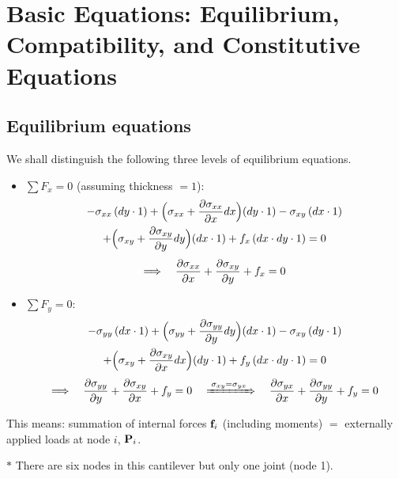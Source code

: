 \chapter[Basic Equations]{Basic Equations: Equilibrium, Compatibility, and Constitutive Equations}

\section{Equilibrium equations}
We shall distinguish the following three levels of equilibrium equations.

\begin{fig}
  
\end{fig}
\begin{itemize}
  \item $\sum F_x = 0$ (assuming thickness $=1$):
  \begin{multline*}
    -\sigma_{xx}\,(dy\cdot 1) + \Bigl(\sigma_{xx}+\frac{\partial \sigma_{xx}}{\partial x}dx\Bigr)(dy\cdot 1)
    - \sigma_{xy}\,(dx\cdot 1) \\
    + \Bigl(\sigma_{xy}+\frac{\partial \sigma_{xy}}{\partial y}dy\Bigr)(dx\cdot 1) + f_x\,(dx\cdot dy\cdot 1) = 0
  \end{multline*}
  \begin{equation}
    \Longrightarrow\quad \frac{\partial \sigma_{xx}}{\partial x}+\frac{\partial \sigma_{xy}}{\partial y}+f_x = 0
  \end{equation}
  \item $\sum F_y = 0$:
  \begin{multline*}
    -\sigma_{yy}\,(dx\cdot 1) + \Bigl(\sigma_{yy}+\frac{\partial \sigma_{yy}}{\partial y}dy\Bigr)(dx\cdot 1)
    - \sigma_{xy}\,(dy\cdot 1) \\
    + \Bigl(\sigma_{xy}+\frac{\partial \sigma_{xy}}{\partial x}dx\Bigr)(dy\cdot 1) + f_y\,(dx\cdot dy\cdot 1) = 0
  \end{multline*}
  \begin{equation}
    \Longrightarrow\quad \frac{\partial \sigma_{yy}}{\partial y}+\frac{\partial \sigma_{xy}}{\partial x}+f_y = 0
    \quad\xRightarrow{\;\sigma_{xy}=\sigma_{yx}\;}\quad
    \frac{\partial \sigma_{yx}}{\partial x}+\frac{\partial \sigma_{yy}}{\partial y}+f_y = 0
  \end{equation}
\end{itemize}

This means: summation of internal forces $\mathbf{f}_i$ (including moments) $=$ externally applied loads at node $i$, $\mathbf{P}_i$.

\noindent$*$ There are six nodes in this cantilever but only one joint (node 1).
\begin{fig}
  
\end{fig}


